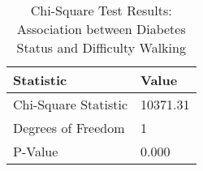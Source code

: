 
\begin{table}[h!]
\centering
\begin{tabular}{|l|l|}
\hline
\textbf{Statistic}       & \textbf{Value} \\ \hline
Chi-Square Statistic        & 10371.31       \\ \hline
Degrees of Freedom          & 1          \\ \hline
P-Value                     & 0.000         \\ \hline
\end{tabular}

\vspace{0.5cm} %

\caption{Chi-Square Test Results: Association between Diabetes Status and Difficulty Walking}
\label{tab:chi_square_difficulty_walking_results}
\end{table}
